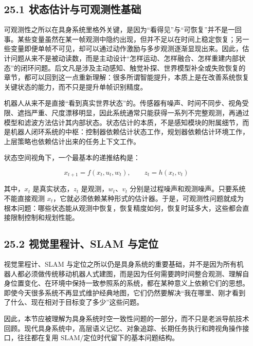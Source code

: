 \subsection*{25.1 状态估计与可观测性基础}


可观测性之所以在具身系统里格外关键，是因为“看得见”与“可恢复”并不是一回事。某些变量虽然在某一帧观测中隐约出现，但并不足以在时间上稳定恢复；另一些变量即便单帧不可见，却可以通过动作激励与多步观测逐渐显现出来。因此，估计问题从来不是被动读数，而是主动设计“怎样运动、怎样融合、怎样重建内部状态”的闭环问题。后文凡是涉及主动感知、触觉补探、世界模型补全或失败恢复的章节，都可以回到这一点重新理解：很多所谓智能提升，本质上是在改善系统恢复关键状态的能力，而不只是提升单帧识别精度。

机器人从来不是直接“看到真实世界状态”的。传感器有噪声、时间不同步、视角受限、遮挡严重、尺度漂移明显，因此系统通常只能获得一系列不完整观测，再通过模型和滤波方法估计其内部状态。状态估计的本质，不是感知模块的附属细节，而是机器人闭环系统的中枢：控制器依赖估计状态工作，规划器依赖估计环境工作，上层策略也依赖估计出来的任务上下文工作。

状态空间视角下，一个最基本的递推结构是：

\begin{equation*}
x_{t+1} = f(x_t, u_t, w_t),\qquad z_t = h(x_t, v_t)
\end{equation*}

其中，\(x_t\) 是真实状态，\(z_t\) 是观测，\(w_t\)、\(v_t\) 分别是过程噪声和观测噪声。只要系统不能直接观测 \(x_t\)，它就必须依赖某种形式的估计器。于是，可观测性问题就成为根本问题：哪些状态能从观测中恢复，恢复精度如何，恢复时延多大，这些都会直接限制控制和规划性能。

\subsection*{25.2 视觉里程计、SLAM 与定位}


视觉里程计、SLAM 与定位之所以仍是具身系统的重要基础，并不是因为所有机器人都必须做传统移动机器人式建图，而是因为任何需要跨时间整合观测、理解自身位置变化、在环境中保持一致参照系的系统，都在某种意义上依赖它们的思想。即使今天很多系统不再显式维护经典地图，它们仍然要解决“我在哪里、刚才看到了什么、现在相对于目标变了多少”这些问题。

因此，本节应被理解为具身系统时空一致性问题的一部分，而不只是老派导航技术回顾。现代具身系统中，高层语义记忆、对象追踪、长期任务执行和跨视角操作接口，往往都在复用 SLAM/定位时代留下的基本问题结构。

